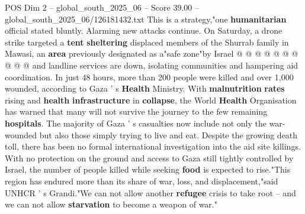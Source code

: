 \begin{textsample}{POS Dim 2 – global\_south\_2025\_06 – Score 39.00 – global\_south\_2025\_06/126181432.txt}
This is a strategy,"one \textbf{humanitarian} official stated bluntly.
Alarming new attacks continue.
On Saturday, a drone strike targeted a \textbf{tent} \textbf{sheltering} displaced members of the Shurrab family in Mawasi, an \textbf{area} previously designated as a"safe zone"by Israel @ @ @ @ @ @ @ @ @ @ and landline services are down, isolating communities and hampering aid coordination.
In just 48 hours, more than 200 people were killed and over 1,000 wounded, according to Gaza ' s \textbf{Health} Ministry.
With \textbf{malnutrition} \textbf{rates} rising and \textbf{health} \textbf{infrastructure} in \textbf{collapse}, the World \textbf{Health} Organisation has warned that many will not survive the journey to the few remaining \textbf{hospitals}.
The majority of Gaza ' s casualties now include not only the war-wounded but also those simply trying to live and eat.
Despite the growing death toll, there has been no formal international investigation into the aid site killings.
With no protection on the ground and access to Gaza still tightly controlled by Israel, the number of people killed while seeking \textbf{food} is expected to rise."This region has endured more than its share of war, loss, and displacement,"said UNHCR ' s Grandi."We can not allow another \textbf{refugee} crisis to take root -- and we can not allow \textbf{starvation} to become a weapon of war."

\end{textsample}
